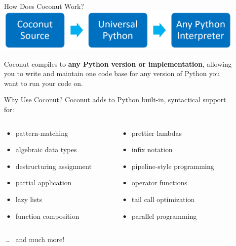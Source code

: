 \documentclass[final,hyperref={pdfpagelabels=false}]{beamer}
\newcommand{\ellipsis}{\,\ldots}
\begin{document}
\begin{frame}[containsverbatim,t]
\begin{columns}[t]
\begin{column}{.32\textwidth}
\begin{block}{How Does Coconut Work?}
\includegraphics[scale=2]{coconut_compilation.png}

Coconut compiles to \textbf{any Python version or implementation}, allowing you to write and maintain one code base for any version of Python you want to run your code on.
\end{block}

\begin{block}{Why Use Coconut?}
Coconut adds to Python built-in, syntactical support for:
\begin{columns}
\begin{column}{.5\textwidth}
\begin{itemize}
\item pattern-matching
\item algebraic data types
\item destructuring assignment
\item partial application
\item lazy lists
\item function composition
\end{itemize}
\end{column}
\begin{column}{.5\textwidth}
\begin{itemize}
\item prettier lambdas
\item infix notation
\item pipeline-style programming
\item operator functions
\item tail call optimization
\item parallel programming
\end{itemize}
\end{column}
\end{columns}

\vspace{.01\textheight}

\hspace{.5\textwidth} \ellipsis~ and much more!
\end{block}


\end{column} %
\begin{column}{.01\textwidth}\end{column} %
\begin{column}{.32\textwidth} %


\end{column}
\end{columns}
\end{frame}
\end{document}
